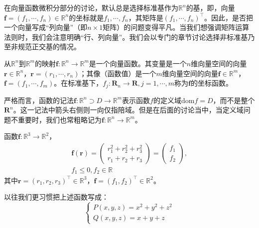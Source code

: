 \documentclass[main.tex]{subfiles}
\begin{document}
在向量函数微积分部分的讨论，默认总是选择标准基作为$\mathbb{R}^n$的基，即，向量$\mathbf{f}=\left(f_1,\cdots,f_n\right)\in\mathbb{R}^n$的坐标就是$f_1,\cdots,f_n$，其矩阵是$\left(f_1,\cdots,f_n\right)^\intercal$。因此，是否把一个向量写成“列向量”（即$n\times 1$矩阵）的问题变得平凡。当我们想强调矩阵运算法则时，我们会注意明确“行、列向量”。我们会以专门的章节讨论选择非标准基乃至非规范正交基的情况。

\begin{definition}[向量函数]
从$\mathbb{R}^n$到$\mathbb{R}^m$的映射$\mathbf{f}:\mathbb{R}^n\rightarrow\mathbb{R}^m$是一个向量函数。其变量是一个$n$维向量空间的向量$\mathbf{r}\in\mathbb{R}^n$，$\mathbf{r}=\left(r_1,\cdots,r_n\right)$；其像（函数值）是一个$m$维向量空间的向量$\mathbf{f}\in\mathbb{R}^m$，$\mathbf{f}=\left(f_1,\cdots,f_m\right)$。在标准基下，$f_j:\mathbf{R}_n\rightarrow\mathbf{R},j=1,\cdots,m$称为$\mathbf{f}$的坐标函数。
\end{definition}

严格而言，函数的记法$\mathbf{f}:\mathbb{R}^n\supset D\rightarrow\mathbb{R}^m$表示函数$f$的定义域$\mathrm{dom}f=D$，而不是整个$\mathbf{R}^n$。这一记法中箭头右侧则一向仅指陪域。但是在后面的讨论当中，当定义域问题不重要时，我们也常粗略记为$\mathbf{f}:\mathbb{R}^n\rightarrow\mathbb{R}^m$。

\begin{example}
函数$\mathbf{f}:\mathbb{R}^3\rightarrow\mathbb{R}^2$，
\[\begin{split}\mathbf{f}\left(\mathbf{r}\right)=\left(\begin{array}{c}r_1^2+r_2^2+r_3^2\\r_1+r_2+r_3\end{array}\right)=\left(\begin{array}{c}f_1\\f_2\end{array}\right),\\f_1\leq0,f_2\in\mathbb{R}\end{split}\]
其中$\mathbf{r}=\left(r_1,r_2,r_3\right)^\intercal\in\mathbb{R}^3$，$\mathbf{f}=\left(f_1,f_2\right)^\intercal\in\mathbb{R}^2$。

以往我们更习惯把上述函数写成：
\[
\left\{\begin{array}{l}
    P\left(x,y,z\right)=x^2+y^2+z^2\\
    Q\left(x,y,z\right)=x+y+z
\end{array}
\right.
\]
\end{example}
\end{document}
